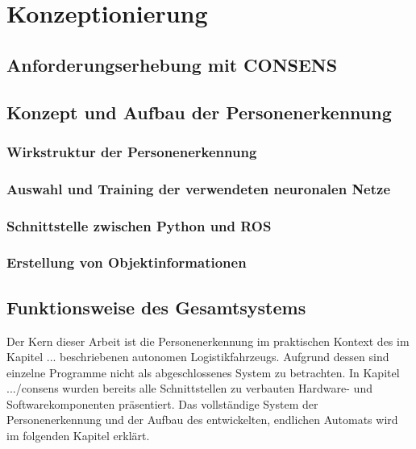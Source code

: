 \chapter{Konzeptionierung}
\label{ch: Konzeptionierung}

	
	
	\section{Anforderungserhebung mit CONSENS}
	\label{sec: Anforderungserhebung}
			
	
	\section{Konzept und Aufbau der Personenerkennung}
	
		\subsection{Wirkstruktur der Personenerkennung}
		
		\subsection{Auswahl und Training der verwendeten neuronalen Netze}
		
		\subsection{Schnittstelle zwischen Python und ROS}
		
		\subsection{Erstellung von Objektinformationen}
	
	\section{Funktionsweise des Gesamtsystems}
	Der Kern dieser Arbeit ist die Personenerkennung im praktischen Kontext des im Kapitel ... beschriebenen autonomen Logistikfahrzeugs. Aufgrund dessen sind einzelne Programme nicht als abgeschlossenes System zu betrachten. In Kapitel .../consens wurden bereits alle Schnittstellen zu verbauten Hardware- und Softwarekomponenten präsentiert. Das vollständige System der Personenerkennung und der Aufbau des entwickelten, endlichen Automats wird im folgenden Kapitel erklärt.\\
	
